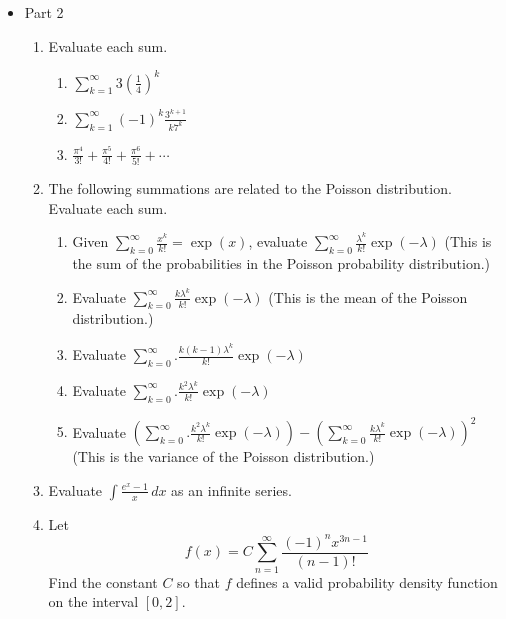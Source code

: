 \documentclass{article}
\begin{document}
\begin{itemize}
\begin{enumerate}
                \end{enumerate}
            \item Part 2
                \begin{enumerate}
                    \item Evaluate each sum.
                        \begin{enumerate}
                            \item $\displaystyle \sum_{k=1}^\infty 3\left(\frac{1}{4}\right)^k$
                            \item $\displaystyle \sum_{k=1}^\infty (-1)^{k}\frac{3^{k+1}}{k7^k}$
                            \item $\displaystyle \frac{\pi^4}{3!}+\frac{\pi^5}{4!}+\frac{\pi^6}{5!}+\cdots$
                        \end{enumerate}
                    \item The following summations are related to the Poisson distribution.  Evaluate each sum.
                        \begin{enumerate}
                            \item Given $\displaystyle \sum_{k=0}^\infty \frac{x^k}{k!}=\exp(x)$, evaluate $\displaystyle\sum_{k=0}^\infty \frac{\lambda^k}{k!}\exp(-\lambda)$  (This is the sum of the probabilities in the Poisson probability distribution.)
                            \item Evaluate $\displaystyle \sum_{k=0}^\infty \frac{k\lambda^k}{k!}\exp(-\lambda)$ (This is the mean of the Poisson distribution.)
                            \item Evaluate $\displaystyle \sum_{k=0}^\infty. \frac{k(k-1)\lambda^k}{k!}\exp(-\lambda)$
                            \item Evaluate $\displaystyle \sum_{k=0}^\infty. \frac{k^2\lambda^k}{k!}\exp(-\lambda)$
                            \item Evaluate $\displaystyle \left( \sum_{k=0}^\infty. \frac{k^2\lambda^k}{k!}\exp(-\lambda)\right) - \left(\sum_{k=0}^\infty \frac{k\lambda^k}{k!}\exp(-\lambda)\right)^2$ (This is the variance of the Poisson distribution.)
                        \end{enumerate}
                    \item Evaluate $\displaystyle \int \frac{e^x-1}{x}\, dx$ as an infinite series.
                    \item Let $$\displaystyle f(x)= C\sum_{n=1}^\infty \frac{(-1)^nx^{3n-1}}{(n-1)!}$$  Find the constant $C$ so that $f$ defines a valid probability density function on the interval $[0,2]$.
                \end{enumerate}
        \end{itemize}
\end{document}
